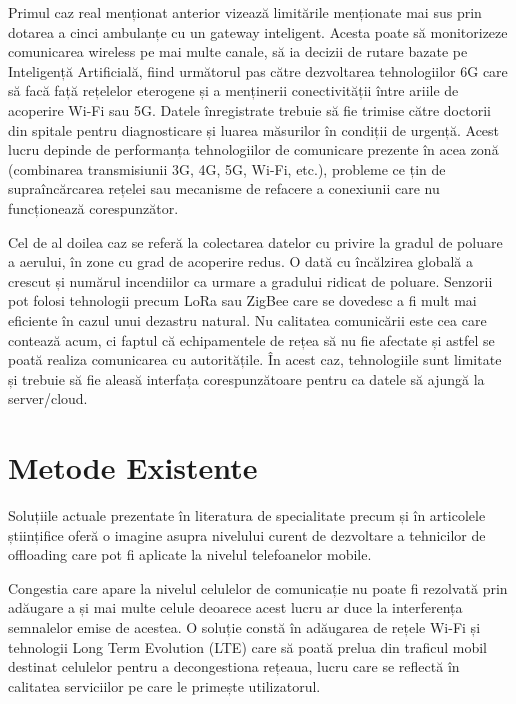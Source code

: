 \documentclass[12pt,a4paper]{report}
\begin{document}
Primul caz real menționat anterior vizează limitările menționate mai sus prin dotarea a cinci ambulanțe cu un gateway inteligent. Acesta poate să monitorizeze comunicarea wireless pe mai multe canale, să ia decizii de rutare bazate pe Inteligență Artificială, fiind următorul pas către dezvoltarea tehnologiilor 6G care să facă față rețelelor eterogene și a menținerii conectivității între ariile de acoperire Wi-Fi sau 5G. Datele înregistrate trebuie să fie trimise către doctorii din spitale pentru diagnosticare și luarea măsurilor în condiții de urgență. Acest lucru depinde de performanța tehnologiilor de comunicare prezente în acea zonă (combinarea transmisiunii 3G, 4G, 5G, Wi-Fi, etc.), probleme ce țin de supraîncărcarea rețelei sau mecanisme de refacere a conexiunii care nu funcționează corespunzător.

Cel de al doilea caz se referă la colectarea datelor cu privire la gradul de poluare a aerului, în zone cu grad de acoperire redus. O dată cu încălzirea globală a crescut și numărul incendiilor ca urmare a gradului ridicat de poluare. Senzorii pot folosi tehnologii precum LoRa sau ZigBee care se dovedesc a fi mult mai eficiente în cazul unui dezastru natural. Nu calitatea comunicării este cea care contează acum, ci faptul că echipamentele de rețea să nu fie afectate și astfel se poată realiza comunicarea cu autoritățile. În acest caz, tehnologiile sunt limitate și trebuie să fie aleasă interfața corespunzătoare pentru ca datele să ajungă la server/cloud.

\chapter{Metode Existente}
Soluțiile actuale prezentate în literatura de specialitate precum și în articolele științifice oferă o imagine asupra nivelului curent de dezvoltare a tehnicilor de offloading care pot fi aplicate la nivelul telefoanelor mobile.

Congestia care apare la nivelul celulelor de comunicație nu poate fi rezolvată prin adăugare a și mai multe celule deoarece acest lucru ar duce la interferența semnalelor emise de acestea. O soluție constă în adăugarea de rețele Wi-Fi și tehnologii Long Term Evolution (LTE) care să poată prelua din traficul mobil destinat celulelor pentru a decongestiona rețeaua, lucru care se reflectă în calitatea serviciilor pe care le primește utilizatorul.
\end{document}
